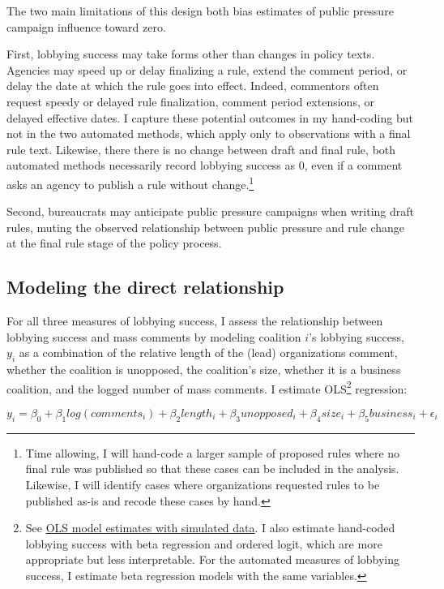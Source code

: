 \documentclass[
      12pt,
        ]{article}
\begin{document}
The two main limitations of this design both bias estimates of public pressure campaign influence toward zero.

First, lobbying success may take forms other than changes in policy texts. Agencies may speed up or delay finalizing a rule, extend the comment period, or delay the date at which the rule goes into effect. Indeed, commentors often request speedy or delayed rule finalization, comment period extensions, or delayed effective dates. I capture these potential outcomes in my hand-coding but not in the two automated methods, which apply only to observations with a final rule text. Likewise, there there is no change between draft and final rule, both automated methods necessarily record lobbying success as 0, even if a comment asks an agency to publish a rule without change.\footnote{Time allowing, I will hand-code a larger sample of proposed rules where no final rule was published so that these cases can be included in the analysis. Likewise, I will identify cases where organizations requested rules to be published as-is and recode these cases by hand.}

Second, bureaucrats may anticipate public pressure campaigns when writing draft rules, muting the observed relationship between public pressure and rule change at the final rule stage of the policy process.

\hypertarget{modeling-the-direct-relationship}{%
\subsection{Modeling the direct relationship}\label{modeling-the-direct-relationship}}

For all three measures of lobbying success, I assess the relationship between lobbying success and mass comments by modeling coalition \(i\)'s lobbying success, \(y_i\) as a combination of the relative length of the (lead) organizations comment, whether the coalition is unopposed, the coalition's size, whether it is a business coalition, and the logged number of mass comments. I estimate OLS\footnote{See \href{https://judgelord.github.io/dissertation/preanalysis.pdf}{OLS model estimates with simulated data}. I also estimate hand-coded lobbying success with beta regression and ordered logit, which are more appropriate but less interpretable. For the automated measures of lobbying success, I estimate beta regression models with the same variables.} regression:

\[
y_i = \beta_0 + \beta_1 log(comments_i) + \beta_2 length_i + \beta_3 unopposed_i + \beta_4 size_i + \beta_5 business_i + \epsilon_i
\]
\end{document}
